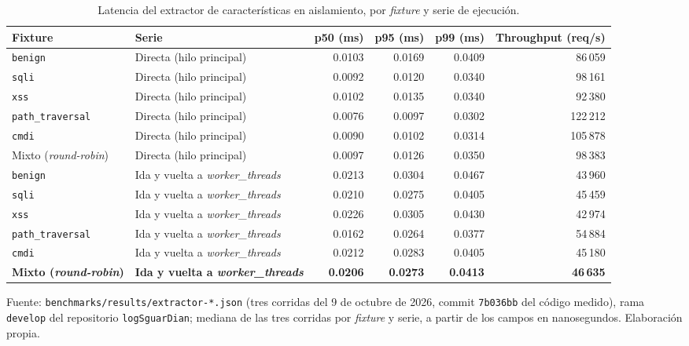 \begin{table}[htbp]
\centering
\footnotesize
\setlength{\tabcolsep}{3pt}
\begin{adjustbox}{max width=\linewidth}
\begin{tabular}{|l|l|r|r|r|r|}
\hline
\textbf{Fixture} & \textbf{Serie} & \textbf{p50 (ms)} & \textbf{p95 (ms)} & \textbf{p99 (ms)} & \textbf{Throughput (req/s)} \\ \hline
\texttt{benign} & Directa (hilo principal) & 0.0103 & 0.0169 & 0.0409 & 86\,059 \\ \hline
\texttt{sqli} & Directa (hilo principal) & 0.0092 & 0.0120 & 0.0340 & 98\,161 \\ \hline
\texttt{xss} & Directa (hilo principal) & 0.0102 & 0.0135 & 0.0340 & 92\,380 \\ \hline
\texttt{path\_traversal} & Directa (hilo principal) & 0.0076 & 0.0097 & 0.0302 & 122\,212 \\ \hline
\texttt{cmdi} & Directa (hilo principal) & 0.0090 & 0.0102 & 0.0314 & 105\,878 \\ \hline
Mixto (\textit{round-robin}) & Directa (hilo principal) & 0.0097 & 0.0126 & 0.0350 & 98\,383 \\ \hline
\texttt{benign} & Ida y vuelta a \textit{worker\_threads} & 0.0213 & 0.0304 & 0.0467 & 43\,960 \\ \hline
\texttt{sqli} & Ida y vuelta a \textit{worker\_threads} & 0.0210 & 0.0275 & 0.0405 & 45\,459 \\ \hline
\texttt{xss} & Ida y vuelta a \textit{worker\_threads} & 0.0226 & 0.0305 & 0.0430 & 42\,974 \\ \hline
\texttt{path\_traversal} & Ida y vuelta a \textit{worker\_threads} & 0.0162 & 0.0264 & 0.0377 & 54\,884 \\ \hline
\texttt{cmdi} & Ida y vuelta a \textit{worker\_threads} & 0.0212 & 0.0283 & 0.0405 & 45\,180 \\ \hline
\textbf{Mixto (\textit{round-robin})} & \textbf{Ida y vuelta a \textit{worker\_threads}} & \textbf{0.0206} & \textbf{0.0273} & \textbf{0.0413} & \textbf{46\,635} \\ \hline
\end{tabular}
\end{adjustbox}
\caption{Latencia del extractor de características en aislamiento, por \textit{fixture} y serie de ejecución.}
\label{tabla:res-extractor}
\par\smallskip\footnotesize Fuente: \texttt{benchmarks/results/extractor-*.json} (tres corridas del 9 de octubre de 2026, commit \texttt{7b036bb} del código medido), rama \texttt{develop} del repositorio \texttt{logSguarDian}; mediana de las tres corridas por \textit{fixture} y serie, a partir de los campos en nanosegundos. Elaboración propia.
\end{table}

